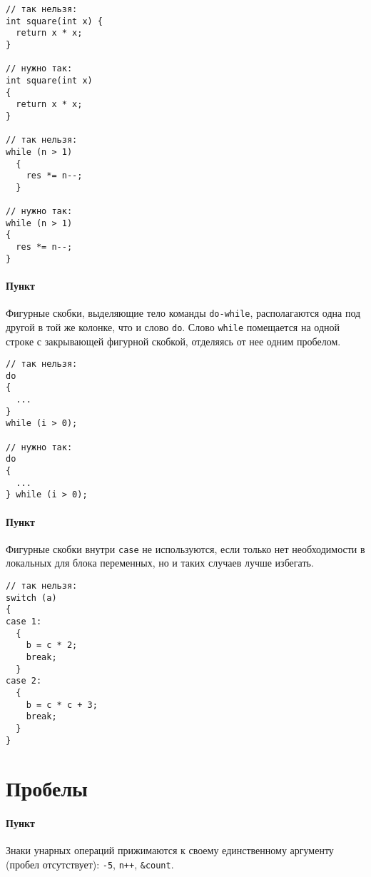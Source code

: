 \begin{verbatim}
// так нельзя:
int square(int x) {
  return x * x; 
}

// нужно так:
int square(int x)
{
  return x * x;
}

// так нельзя:
while (n > 1)
  {
    res *= n--;
  }

// нужно так:
while (n > 1)
{
  res *= n--;
}
\end{verbatim}

\paragraph{Пункт}

Фигурные скобки, выделяющие тело команды \texttt{do-while},
располагаются одна под другой в той же колонке, что и слово \texttt{do}.
Слово \texttt{while} помещается на одной строке с закрывающей фигурной
скобкой, отделяясь от нее одним пробелом.

\begin{verbatim}
// так нельзя:
do
{
  ...
}
while (i > 0);

// нужно так:
do
{
  ...
} while (i > 0);
\end{verbatim}

\paragraph{Пункт}

Фигурные скобки внутри \texttt{case} не используются, если только нет
необходимости в локальных для блока переменных, но и таких случаев лучше
избегать.

\begin{verbatim}
// так нельзя:
switch (a)
{
case 1:
  {
    b = c * 2;
    break;
  }
case 2:
  {
    b = c * c + 3;
    break;
  }
}
\end{verbatim}


\section{Пробелы}


\paragraph{Пункт}

Знаки унарных операций прижимаются к своему единственному аргументу
(пробел отсутствует): \texttt{-5}, \texttt{n++}, \texttt{\&count}.


